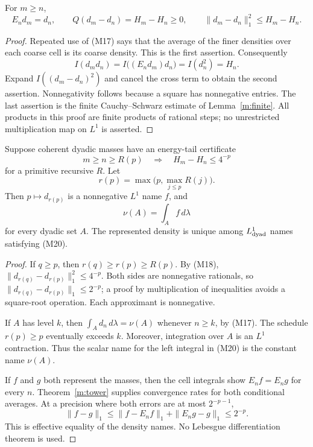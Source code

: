 \begin{lemma}\label{m:energy}
For \(m\ge n\),
\[
 E_n d_m=d_n,\qquad
 Q(d_m-d_n)=H_m-H_n\ge0,\qquad
 \|d_m-d_n\|_1^2\le H_m-H_n.
 \tag{M18}
\]
\end{lemma}

\begin{proof}
Repeated use of (M17) says that the average of the finer densities over each
coarse cell is its coarse density.  This is the first assertion.
Consequently
\[
 I(d_m d_n)=I\bigl((E_nd_m)d_n\bigr)=I(d_n^2)=H_n.
 \]
Expand \(I((d_m-d_n)^2)\) and cancel the cross term to obtain the second
assertion.  Nonnegativity follows because a square has nonnegative entries.
The last assertion is the finite Cauchy--Schwarz estimate of
Lemma~\ref{m:finite}.  All products in this proof are finite products of
rational steps; no unrestricted multiplication map on \(L^1\) is asserted.
\end{proof}

\begin{theorem}\label{m:rn}
Suppose coherent dyadic masses have an energy-tail certificate
\[
 m\ge n\ge R(p)\quad\Longrightarrow\quad H_m-H_n\le4^{-p}
 \tag{M19}
\]
for a primitive recursive \(R\).  Let
\[
 r(p)=\max\bigl(p,\max_{j\le p}R(j)\bigr).
 \]
Then \(p\mapsto d_{r(p)}\) is a nonnegative \(L^1\) name \(f\), and
\[
 \nu(A)=\int_A f\,d\lambda
 \tag{M20}
\]
for every dyadic set \(A\).  The represented density is unique among
\(L^1_{\rm dyad}\) names satisfying (M20).
\end{theorem}

\begin{proof}
If \(q\ge p\), then \(r(q)\ge r(p)\ge R(p)\).  By (M18),
\(\|d_{r(q)}-d_{r(p)}\|_1^2\le4^{-p}\).
Both sides are nonnegative rationals, so
\(\|d_{r(q)}-d_{r(p)}\|_1\le2^{-p}\); a proof by multiplication of
inequalities avoids a square-root operation.  Each approximant is
nonnegative.

If \(A\) has level \(k\), then
\(\int_A d_n\,d\lambda=\nu(A)\) whenever \(n\ge k\), by (M17).
The schedule \(r(p)\ge p\) eventually exceeds \(k\).
Moreover, integration over \(A\) is an \(L^1\) contraction.
Thus the scalar name for the left integral in (M20) is the constant name
\(\nu(A)\).

If \(f\) and \(g\) both represent the masses, then the cell integrals show
\(E_n f=E_n g\) for every \(n\).  Theorem~\ref{m:tower} supplies convergence
rates for both conditional averages.  At a precision where both errors are
at most \(2^{-p-1}\),
\[
 \|f-g\|_1\le\|f-E_nf\|_1+\|E_ng-g\|_1\le2^{-p}.
 \]
This is effective equality of the density names.  No Lebesgue differentiation
theorem is used.
\end{proof}

